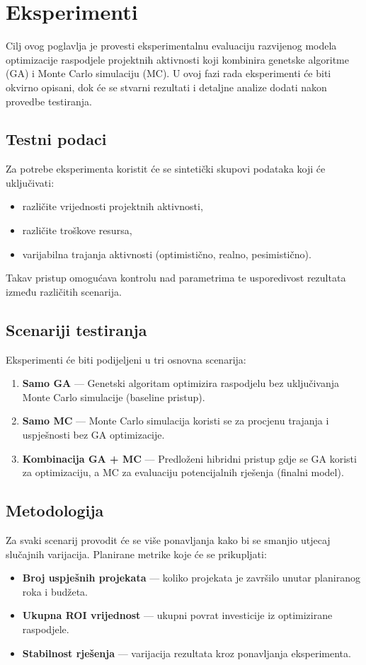 \section{Eksperimenti}

Cilj ovog poglavlja je provesti eksperimentalnu evaluaciju razvijenog modela optimizacije raspodjele projektnih aktivnosti koji kombinira genetske algoritme (GA) i Monte Carlo simulaciju (MC). U ovoj fazi rada eksperimenti će biti okvirno opisani, dok će se stvarni rezultati i detaljne analize dodati nakon provedbe testiranja.

\subsection{Testni podaci}
Za potrebe eksperimenta koristit će se sintetički skupovi podataka koji će uključivati:
\begin{itemize}
    \item različite vrijednosti projektnih aktivnosti,
    \item različite troškove resursa,
    \item varijabilna trajanja aktivnosti (optimistično, realno, pesimistično).
\end{itemize}
Takav pristup omogućava kontrolu nad parametrima te usporedivost rezultata između različitih scenarija.

\subsection{Scenariji testiranja}
Eksperimenti će biti podijeljeni u tri osnovna scenarija:
\begin{enumerate}
    \item \textbf{Samo GA} — Genetski algoritam optimizira raspodjelu bez uključivanja Monte Carlo simulacije (baseline pristup).
    \item \textbf{Samo MC} — Monte Carlo simulacija koristi se za procjenu trajanja i uspješnosti bez GA optimizacije.
    \item \textbf{Kombinacija GA + MC} — Predloženi hibridni pristup gdje se GA koristi za optimizaciju, a MC za evaluaciju potencijalnih rješenja (finalni model).
\end{enumerate}

\subsection{Metodologija}
Za svaki scenarij provodit će se više ponavljanja kako bi se smanjio utjecaj slučajnih varijacija.  
Planirane metrike koje će se prikupljati:
\begin{itemize}
    \item \textbf{Broj uspješnih projekata} — koliko projekata je završilo unutar planiranog roka i budžeta.
    \item \textbf{Ukupna ROI vrijednost} — ukupni povrat investicije iz optimizirane raspodjele.
    \item \textbf{Stabilnost rješenja} — varijacija rezultata kroz ponavljanja eksperimenta.
\end{itemize}

